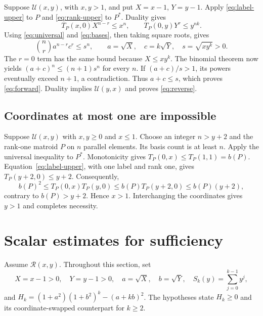 \documentclass[11pt,a4paper]{article}
\newcommand{\U}{\mathcal U}
\newcommand{\Reg}{\mathcal R}
\begin{document}
Suppose $\U(x,y)$, with $x,y>1$, and put $X=x-1$, $Y=y-1$.
Apply \eqref{eq:label-upper} to $P$ and \eqref{eq:rank-upper} to $P^*$.
Duality gives
\[
T_P(x,0)X^{n-r}\leq x^n,\qquad T_P(0,y)Y^r\leq y^{nk}.
\]
Using \eqref{eq:universal} and \eqref{eq:bases}, then taking square roots,
gives
\[
\binom nr a^{n-r}c^r\leq s^n,
\qquad a=\sqrt X,\quad c=k\sqrt Y,\quad s=\sqrt{xy^k}>0.
\]
The $r=0$ term has the same bound because $X\leq xy^k$.
The binomial theorem now yields $(a+c)^n\leq(n+1)s^n$ for every $n$.
If $(a+c)/s>1$, its powers eventually exceed $n+1$, a contradiction.
Thus $a+c\leq s$, which proves \eqref{eq:forward}.
Duality implies $\U(y,x)$ and proves \eqref{eq:reverse}.

\subsection{Coordinates at most one are impossible}
Suppose $\U(x,y)$ with $x,y\geq0$ and $x\leq1$.
Choose an integer $n>y+2$ and the rank-one matroid $P$ on $n$ parallel
elements. Its basis count is at least $n$. Apply the universal inequality
to $P^*$. Monotonicity gives $T_P(0,x)\leq T_P(1,1)=b(P)$.
Equation~\eqref{eq:label-upper}, with one label and rank one, gives
$T_P(y+2,0)\leq y+2$. Consequently,
\[
b(P)^2\leq T_P(0,x)T_P(y,0)
\leq b(P)T_P(y+2,0)\leq b(P)(y+2),
\]
contrary to $b(P)>y+2$. Hence $x>1$. Interchanging the coordinates gives
$y>1$ and completes necessity.

\section{Scalar estimates for sufficiency}

Assume $\Reg(x,y)$. Throughout this section, set
\[
X=x-1>0,\quad Y=y-1>0,\quad a=\sqrt X,\quad b=\sqrt Y,
\quad S_k(y)=\sum_{j=0}^{k-1}y^j,
\]
and $H_k=(1+a^2)(1+b^2)^k-(a+kb)^2$.
The hypotheses state $H_k\geq0$ and its coordinate-swapped counterpart
for $k\geq2$.
\end{document}
